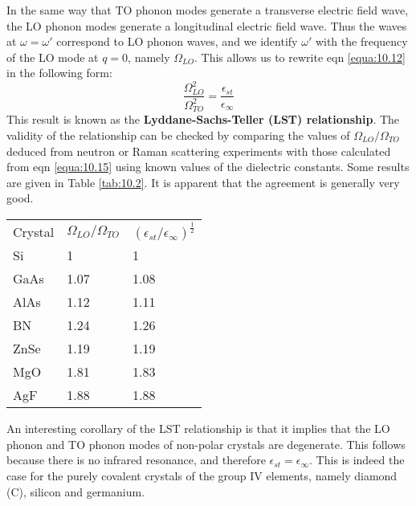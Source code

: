 \documentclass[12pt]{book}
\begin{document}
In the same way that TO phonon modes generate a transverse electric field wave, the LO phonon modes generate a longitudinal electric field wave. Thus the waves at $\omega=\omega'$ correspond to LO phonon waves, and we identify $\omega'$ with the frequency of the LO mode at $q=0$, namely $\Omega_{LO}$. This allows us to rewrite eqn \ref{equa:10.12} in the following form:
\begin{equation}\label{equa:10.15}
  \frac{\Omega_{LO}^2}{\Omega_{TO}^2}=\frac{\epsilon_{st}}{\epsilon_{\infty}}
\end{equation}
This result is known as the \textbf{Lyddane-Sachs-Teller (LST) relationship}. The validity of the relationship can be checked by comparing the values of $\Omega_{LO}/\Omega_{TO}$ deduced from neutron or Raman scattering experiments with those calculated from eqn \ref{equa:10.15} using known values of the dielectric constants. Some results are given in Table \ref{tab:10.2}. It is apparent that the agreement is generally very good.

\begin{table}
  \centering
  \begin{tabular}{lll}

    Crystal & $\Omega_{LO}/\Omega_{TO}$ & $(\epsilon_{st}/\epsilon_{\infty})^{\frac{1}{2}}$ \\
    Si & 1 & 1 \\
    GaAs & 1.07 & 1.08 \\
    AlAs & 1.12 & 1.11 \\
    BN & 1.24 & 1.26 \\
    ZnSe & 1.19 & 1.19 \\
    MgO & 1.81 & 1.83 \\
    AgF & 1.88 & 1.88 \\

  \end{tabular}
\end{table}

An interesting corollary of the LST relationship is that it implies that the LO phonon and TO phonon modes of non-polar crystals are degenerate. This follows because there is no infrared resonance, and therefore $\epsilon_{st}=\epsilon_{\infty}$. This is indeed the case for the purely covalent crystals of the group IV elements, namely diamond (C), silicon and germanium.
\end{document}
